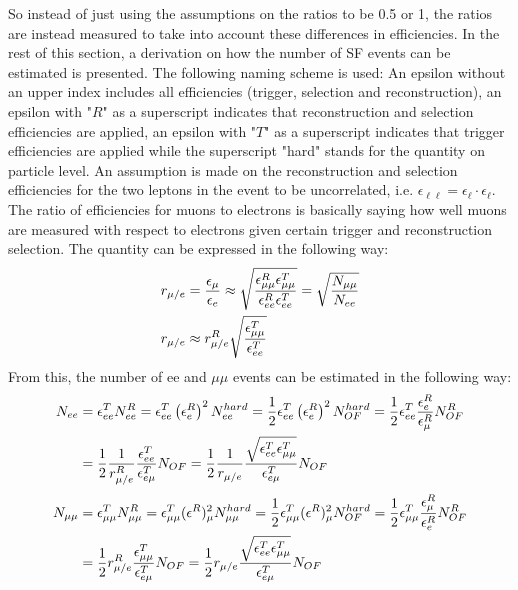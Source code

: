 So instead of just using the assumptions on the ratios to be 0.5 or 1, the ratios are instead measured to take into account these differences in efficiencies. 
In the rest of this section, a derivation on how the number of SF events can be estimated is presented. 
The following naming scheme is used: 
An epsilon without an upper index includes all efficiencies (trigger, selection and reconstruction), an epsilon with "$R$" as a superscript indicates that reconstruction and selection efficiencies are applied, an epsilon with "$T$" as a superscript indicates that trigger efficiencies are applied while the superscript "hard" stands for the quantity on particle level.
An assumption is made on the reconstruction and selection efficiencies for the two leptons in the event to be uncorrelated, i.e. $\epsilon_{\ell\ell}=\epsilon_{\ell} \cdot \epsilon_{\ell}$. 
The ratio of efficiencies for muons to electrons is basically saying how well muons are measured with respect to electrons given certain trigger and reconstruction selection. 
The quantity can be expressed in the following way:
\begin{align}
\label{eq:rMue}
r_{\mu/e} & = \frac{\epsilon_{\mu}}{\epsilon_{e}} \approx \sqrt{ \frac{\epsilon^{R}_{\mu\mu}\epsilon^{T}_{\mu\mu}}{\epsilon^{R}_{ee}\epsilon^{T}_{ee}}} = \sqrt{ \frac{N_{\mu\mu}}{N_{ee}}} \notag \\
r_{\mu/e} & \approx r^{R}_{\mu/e}\sqrt{ \frac{\epsilon^{T}_{\mu\mu}}{\epsilon^{T}_{ee}}}
\end{align}
From this, the number of ee and $\mu\mu$ events can be estimated in the following way:
\begin{align}
\label{eq:eeFormula}
N_{ee} & = \epsilon^{T}_{ee} N^{R}_{ee} = \epsilon^{T}_{ee} \left(\epsilon^{R}_{e}\right)^{2} N^{hard}_{ee} = \frac{1}{2} \epsilon^{T}_{ee} \left(\epsilon^{R}_{e}\right)^{2} N^{hard}_{OF} 
										= \frac{1}{2} \epsilon^{T}_{ee} \frac{\epsilon^{R}_{e}}{\epsilon^{R}_{\mu}} N^{R}_{OF} \notag \\
       & =\frac{1}{2} \frac{1}{r^{R}_{\mu/e}} \frac{\epsilon^{T}_{ee}}{\epsilon^{T}_{e\mu}}N_{OF} 
										= \frac{1}{2} \frac{1}{r_{\mu/e}} \frac{\sqrt{\epsilon^{T}_{ee}\epsilon^{T}_{\mu\mu}}}{\epsilon^{T}_{e\mu}} N_{OF}  \notag \\
\end{align}
\begin{align}
\label{eq:mumuFormula}
N_{\mu\mu} & = \epsilon^{T}_{\mu\mu} N^{R}_{\mu\mu} = \epsilon^{T}_{\mu\mu} (\epsilon^{R})^{2}_{\mu} N^{hard}_{\mu\mu} = \frac{1}{2} \epsilon^{T}_{\mu\mu} (\epsilon^{R})^{2}_{\mu} N^{hard}_{OF}
										= \frac{1}{2} \epsilon^{T}_{\mu\mu} \frac{\epsilon^{R}_{\mu}}{\epsilon^{R}_{e}} N^{R}_{OF}  \notag \\
	  & =\frac{1}{2} r^{R}_{\mu/e} \frac{\epsilon^{T}_{\mu\mu}}{\epsilon^{T}_{e\mu}}N_{OF} = \frac{1}{2} r_{\mu/e} \frac{\sqrt{\epsilon^{T}_{ee}\epsilon^{T}_{\mu\mu}}}{\epsilon^{T}_{e\mu}} N_{OF}
\end{align}
